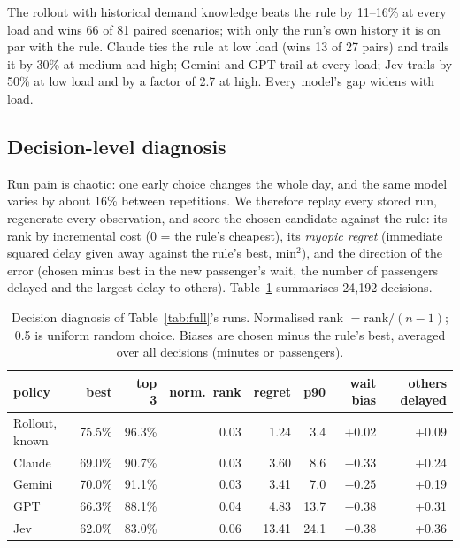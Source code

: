 \documentclass[11pt]{article}
\newcommand{\minsq}{\mathrm{min}^2}
\begin{document}
The rollout with historical demand knowledge beats the rule by 11--16\% at every load and wins 66 of 81 paired scenarios; with only the run's own history it is on par with the rule. Claude ties the rule at low load (wins 13 of 27 pairs) and trails it by 30\% at medium and high; Gemini and GPT trail at every load; Jev trails by 50\% at low load and by a factor of 2.7 at high. Every model's gap widens with load.

\subsection{Decision-level diagnosis}
\label{sec:diagnosis}
Run pain is chaotic: one early choice changes the whole day, and the same model varies by about 16\% between repetitions. We therefore replay every stored run, regenerate every observation, and score the chosen candidate against the rule: its rank by incremental cost (0 = the rule's cheapest), its \emph{myopic regret} (immediate squared delay given away against the rule's best, $\minsq$), and the direction of the error (chosen minus best in the new passenger's wait, the number of passengers delayed and the largest delay to others). Table~\ref{tab:diag} summarises 24{,}192 decisions.

\begin{table}[t]
\centering
\caption{Decision diagnosis of Table~\ref{tab:full}'s runs. Normalised rank $= \mathrm{rank}/(n-1)$; 0.5 is uniform random choice. Biases are chosen minus the rule's best, averaged over all decisions (minutes or passengers).}
\label{tab:diag}
\begin{tabular}{lrrrrrrr}
\toprule
policy & best & top 3 & norm.\ rank & regret & p90 & wait bias & others delayed \\
\midrule
Rollout, known & 75.5\% & 96.3\% & 0.03 & 1.24 & 3.4 & +0.02 & +0.09 \\
Claude & 69.0\% & 90.7\% & 0.03 & 3.60 & 8.6 & $-$0.33 & +0.24 \\
Gemini & 70.0\% & 91.1\% & 0.03 & 3.41 & 7.0 & $-$0.25 & +0.19 \\
GPT & 66.3\% & 88.1\% & 0.04 & 4.83 & 13.7 & $-$0.38 & +0.31 \\
Jev & 62.0\% & 83.0\% & 0.06 & 13.41 & 24.1 & $-$0.38 & +0.36 \\
\bottomrule
\end{tabular}
\end{table}
\end{document}
